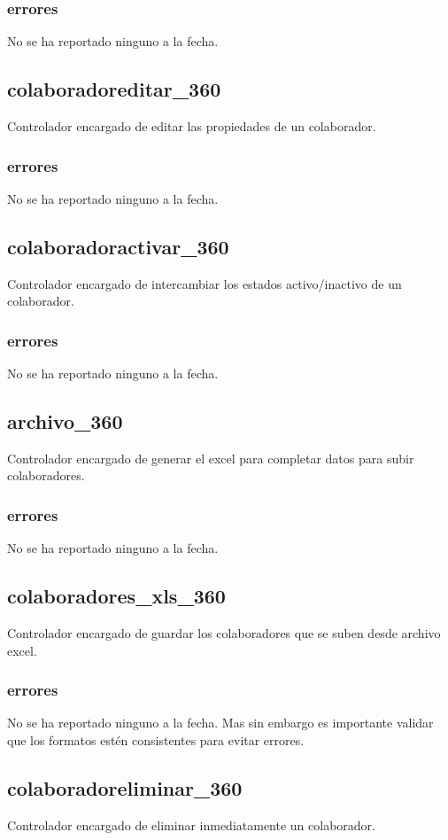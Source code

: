 \documentclass[10pt,a4paper]{book}
\begin{document}
	\subsubsection{errores}
	No se ha reportado ninguno a la fecha.
	
	\subsection{colaboradoreditar\_360}
	Controlador encargado de editar las propiedades de un colaborador.
	\subsubsection{errores}
	No se ha reportado ninguno a la fecha.
	
	\subsection{colaboradoractivar\_360}
	Controlador encargado de intercambiar los estados activo/inactivo de un colaborador.
	\subsubsection{errores}
	No se ha reportado ninguno a la fecha.
	
	\subsection{archivo\_360}
	Controlador encargado de generar el excel para completar datos para subir colaboradores.
	\subsubsection{errores}
	No se ha reportado ninguno a la fecha.
	
	\subsection{colaboradores\_xls\_360}
	Controlador encargado de guardar los colaboradores que se suben desde archivo excel.
	\subsubsection{errores}
	No se ha reportado ninguno a la fecha. Mas sin embargo es importante validar que los formatos estén consistentes para evitar errores.
	
	\subsection{colaboradoreliminar\_360}
	Controlador encargado de eliminar inmediatamente un colaborador.
\end{document}

